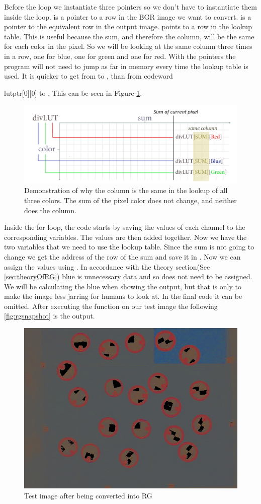 Before the loop we instantiate three pointers so we don't have to instantiate them inside the loop.  is a pointer to a row in the BGR image we want to convert.  is a pointer to the equivalent row in the output image.  points to a row in the lookup table. This is useful because the sum, and therefore the column, will be the same for each color in the pixel. So we will be looking at the same column three times in a row, one for blue, one for green and one for red. With the pointers the program will not need to jump as far in memory every time the lookup table is used. It is quicker to get from  to , than from codeword{lutptr[0][0] to . This can be seen in Figure \ref{fig:table}.
\begin{figure}[H]
	\centering
	\includegraphics[width=0.9\linewidth]{figure/Analysis/table.png}
	\caption{Demonstration of why the column is the same in the lookup of all three colors. The sum of the pixel color does not change, and neither does the column.}
	\label{fig:table}
\end{figure} 
Inside the for loop, the code starts by saving the values of each channel to the corresponding variables. The values are then added together. Now we have the two variables that we need to use the lookup table. Since the sum is not going to change we get the address of the row of the sum and save it in . Now we can assign the values using . In accordance with the theory section(See \autoref{sec:theoryOfRG}) blue is unnecessary data and so does not need to be assigned. We will be calculating the blue when showing the output, but that is only to make the image less jarring for humans to look at. In the final code it can be omitted. After executing the function on our test image the following \autoref{fig:rgsnapshot} is the output.
\begin{figure}[H]
	\centering
	\includegraphics[width=0.6\linewidth]{figure/Analysis/rgbNorm.png}
	\caption{Test image after being converted into RG}
	\label{fig:rgsnapshot}
\end{figure} 

}
